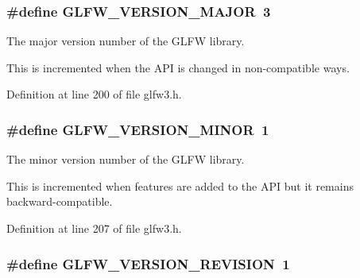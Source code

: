 \subsubsection[{G\+L\+F\+W\+\_\+\+V\+E\+R\+S\+I\+O\+N\+\_\+\+M\+A\+J\+O\+R}]{\setlength{\rightskip}{0pt plus 5cm}\#define G\+L\+F\+W\+\_\+\+V\+E\+R\+S\+I\+O\+N\+\_\+\+M\+A\+J\+O\+R~3}\label{group__init_ga6337d9ea43b22fc529b2bba066b4a576}


The major version number of the G\+L\+F\+W library. 

This is incremented when the A\+P\+I is changed in non-\/compatible ways. 

Definition at line 200 of file glfw3.\+h.

\hypertarget{group__init_gaf80d40f0aea7088ff337606e9c48f7a3}{}
\subsubsection[{G\+L\+F\+W\+\_\+\+V\+E\+R\+S\+I\+O\+N\+\_\+\+M\+I\+N\+O\+R}]{\setlength{\rightskip}{0pt plus 5cm}\#define G\+L\+F\+W\+\_\+\+V\+E\+R\+S\+I\+O\+N\+\_\+\+M\+I\+N\+O\+R~1}\label{group__init_gaf80d40f0aea7088ff337606e9c48f7a3}


The minor version number of the G\+L\+F\+W library. 

This is incremented when features are added to the A\+P\+I but it remains backward-\/compatible. 

Definition at line 207 of file glfw3.\+h.

\hypertarget{group__init_gab72ae2e2035d9ea461abc3495eac0502}{}
\subsubsection[{G\+L\+F\+W\+\_\+\+V\+E\+R\+S\+I\+O\+N\+\_\+\+R\+E\+V\+I\+S\+I\+O\+N}]{\setlength{\rightskip}{0pt plus 5cm}\#define G\+L\+F\+W\+\_\+\+V\+E\+R\+S\+I\+O\+N\+\_\+\+R\+E\+V\+I\+S\+I\+O\+N~1}\label{group__init_gab72ae2e2035d9ea461abc3495eac0502}


